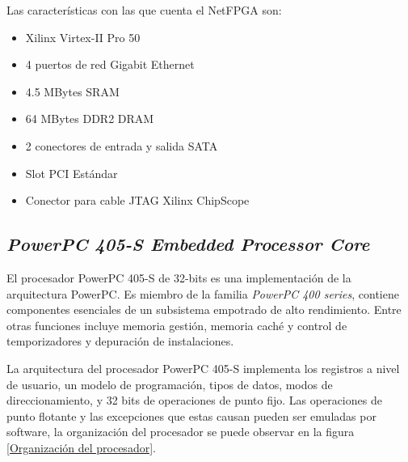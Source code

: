 Las características con las que cuenta el NetFPGA son:

  \begin{itemize}
   \item Xilinx Virtex-II Pro 50
   \item 4 puertos de red Gigabit Ethernet
   \item 4.5 MBytes SRAM
   \item 64 MBytes DDR2 DRAM
   \item 2 conectores de entrada y salida SATA
   \item Slot PCI Estándar
   \item Conector para cable JTAG Xilinx ChipScope 
  \end{itemize}

\subsection{\emph{PowerPC 405-S Embedded Processor Core}}

El procesador PowerPC 405-S de 32-bits es una implementación de la arquitectura
PowerPC. Es miembro de la familia \emph{PowerPC 400 series}, contiene 
componentes esenciales de un subsistema empotrado de alto rendimiento. Entre
otras funciones incluye memoria gestión, memoria caché y control de
temporizadores y depuración de instalaciones.

La arquitectura del procesador PowerPC 405-S implementa los registros a nivel de
usuario, un modelo de programación, tipos de datos, modos de direccionamiento, y
 32 bits de operaciones de punto fijo. Las operaciones de punto flotante y 
las excepciones que estas causan pueden ser emuladas por software, la
organización del procesador se puede observar en la figura \ref{Organización del
procesador}.

